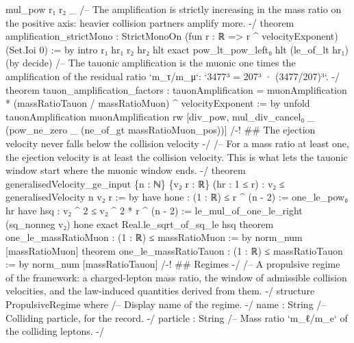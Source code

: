 \documentclass[11pt,a4paper]{article}
\begin{document}
{  mul\_\allowbreak{}pow r₁ r₂ \_\allowbreak{}
\mbox{}
/-- The amplification is strictly increasing in the mass ratio on the positive
axis: heavier collision partners amplify more. -/
theorem amplification\_\allowbreak{}strictMono :
    StrictMonoOn (fun r : ℝ =\textgreater{} r \textasciicircum{} velocityExponent) (Set.Ioi 0) := by
  intro r₁ hr₁ r₂ hr₂ hlt
  exact pow\_\allowbreak{}lt\_\allowbreak{}pow\_\allowbreak{}left₀ hlt (le\_\allowbreak{}of\_\allowbreak{}lt hr₁) (by decide)
\mbox{}
/-- The tauonic amplification is the muonic one times the amplification of the
residual ratio `m\_\allowbreak{}τ/m\_\allowbreak{}μ`: `3477³ = 207³ · (3477/207)³`. -/
theorem tauon\_\allowbreak{}amplification\_\allowbreak{}factors :
    tauonAmplification = muonAmplification * (massRatioTauon / massRatioMuon) \textasciicircum{} velocityExponent := by
  unfold tauonAmplification muonAmplification
  rw [div\_\allowbreak{}pow, mul\_\allowbreak{}div\_\allowbreak{}cancel₀ \_\allowbreak{} (pow\_\allowbreak{}ne\_\allowbreak{}zero \_\allowbreak{} (ne\_\allowbreak{}of\_\allowbreak{}gt massRatioMuon\_\allowbreak{}pos))]
\mbox{}
/-! \#\# The ejection velocity never falls below the collision velocity -/
\mbox{}
/-- For a mass ratio at least one, the ejection velocity is at least the
collision velocity.  This is what lets the tauonic window start where the muonic
window ends. -/
theorem generalisedVelocity\_\allowbreak{}ge\_\allowbreak{}input \{n : ℕ\} \{v₂ r : ℝ\} (hr : 1 ≤ r) :
    v₂ ≤ generalisedVelocity n v₂ r := by
  have hone : (1 : ℝ) ≤ r \textasciicircum{} (n - 2) := one\_\allowbreak{}le\_\allowbreak{}pow₀ hr
  have hsq : v₂ \textasciicircum{} 2 ≤ v₂ \textasciicircum{} 2 * r \textasciicircum{} (n - 2) := le\_\allowbreak{}mul\_\allowbreak{}of\_\allowbreak{}one\_\allowbreak{}le\_\allowbreak{}right (sq\_\allowbreak{}nonneg v₂) hone
  exact Real.le\_\allowbreak{}sqrt\_\allowbreak{}of\_\allowbreak{}sq\_\allowbreak{}le hsq
\mbox{}
theorem one\_\allowbreak{}le\_\allowbreak{}massRatioMuon : (1 : ℝ) ≤ massRatioMuon := by
  norm\_\allowbreak{}num [massRatioMuon]
\mbox{}
theorem one\_\allowbreak{}le\_\allowbreak{}massRatioTauon : (1 : ℝ) ≤ massRatioTauon := by
  norm\_\allowbreak{}num [massRatioTauon]
\mbox{}
/-! \#\# Regimes -/
\mbox{}
/-- A propulsive regime of the framework: a charged-lepton mass ratio, the
window of admissible collision velocities, and the law-induced quantities
derived from them. -/
structure PropulsiveRegime where
  /-- Display name of the regime. -/
  name : String
  /-- Colliding particle, for the record. -/
  particle : String
  /-- Mass ratio `m\_\allowbreak{}ℓ/m\_\allowbreak{}e` of the colliding leptons. -/
}
\end{document}
